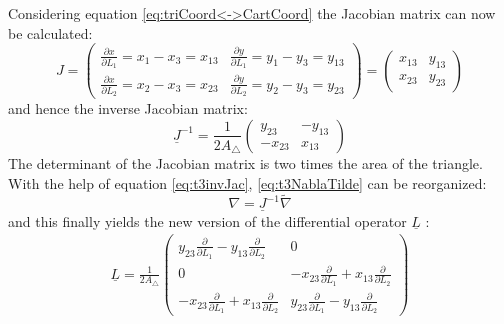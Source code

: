   Considering equation \eqref{eq:triCoord<->CartCoord} the Jacobian matrix can now be calculated:
  \begin{equation}
  J = \begin{pmatrix}
  \frac{\partial x}{\partial L_1} = x_1-x_3 = x_{13} & \frac{\partial y}{\partial L_1} = y_1-y_3 = y_{13}\\
  \frac{\partial x}{\partial L_2} = x_2-x_3 = x_{23} & \frac{\partial y}{\partial L_2} = y_2-y_3 = y_{23}
  \end{pmatrix} = \begin{pmatrix}
  x_{13} & y_{13}\\
  x_{23} & y_{23}
  \end{pmatrix}
  \end{equation}
  and hence the inverse Jacobian matrix:
  \begin{equation}\label{eq:t3invJac}
  \underline{J}^{-1} = \frac{1}{2 A_\triangle} \begin{pmatrix}
  y_{23} & -y_{13}\\
  -x_{23} & x_{13}
  \end{pmatrix}
  \end{equation}
  The determinant of the Jacobian matrix is two times the area of the triangle. With the help of equation \eqref{eq:t3invJac}, \eqref{eq:t3NablaTilde} can be reorganized:
  \begin{equation}\label{eq:nabla=invJ*nabla-tilde}
  \nabla = \underline{J}^{-1} \tilde{\nabla}
  \end{equation}
  and this finally yields the new version of the differential operator $\underline{L}$ \cite{steinke2005finite}:
  \begin{align}
  \underline{L} = \frac{1}{2 A_\triangle} \begin{pmatrix}
  y_{23}\frac{\partial}{\partial L_1} - y_{13}\frac{\partial}{\partial L_2} & 0 \\
  0 & -x_{23}\frac{\partial}{\partial L_1} + x_{13}\frac{\partial}{\partial L_2} \\
  -x_{23}\frac{\partial}{\partial L_1} + x_{13}\frac{\partial}{\partial L_2} & y_{23}\frac{\partial}{\partial L_1} - y_{13}\frac{\partial}{\partial L_2}
  \end{pmatrix}
  \end{align}
  
